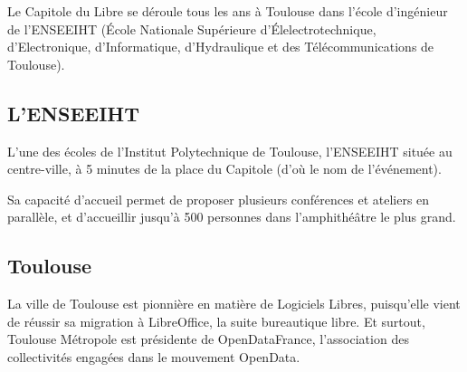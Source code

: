 
Le Capitole du Libre se déroule tous les ans à Toulouse dans l'école
 d'ingénieur de l'ENSEEIHT (École Nationale Supérieure
 d'Élelectrotechnique, d'Electronique, d'Informatique, d'Hydraulique
 et des Télécommunications de Toulouse). 

\subsection{L'ENSEEIHT}

L'une des écoles de l'Institut Polytechnique de Toulouse, l'ENSEEIHT
 située au centre-ville, à 5 minutes de la place du Capitole (d'où le
 nom de l'événement).

Sa capacité d'accueil permet de proposer plusieurs conférences et
 ateliers en parallèle, et d'accueillir jusqu'à 500 personnes dans
 l'amphithéâtre le plus grand.

\subsection{Toulouse}

La ville de Toulouse est pionnière en matière de Logiciels Libres,
 puisqu'elle vient de réussir sa migration à LibreOffice, la suite
 bureautique libre. Et surtout, Toulouse Métropole est présidente
 de OpenDataFrance, l'association des collectivités engagées dans
 le mouvement OpenData.

